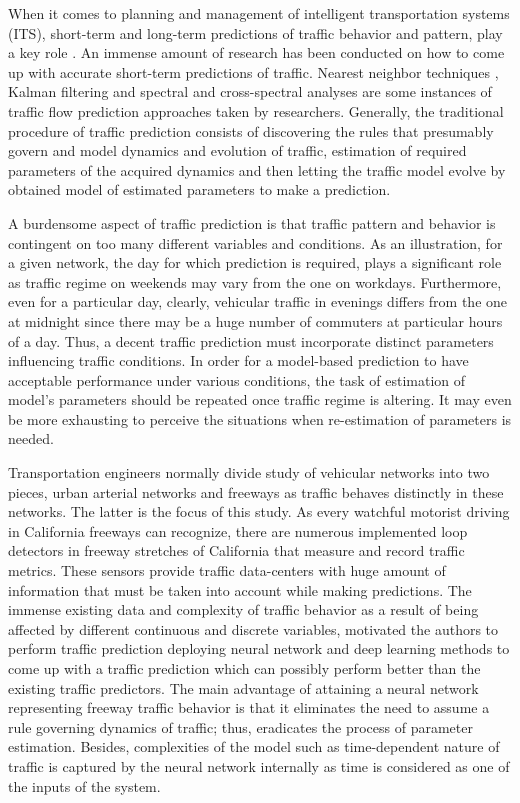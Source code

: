 \documentclass[twocolumn,10pt]{asme2e}
\begin{document}
When it comes to planning and management of intelligent transportation systems (ITS), short-term and long-term predictions of traffic behavior and pattern, play a key role \cite{TrafficPrediction}. An immense amount of research has been conducted on how to come up with accurate short-term predictions of traffic. Nearest neighbor techniques \cite{nearestNeighbor}, Kalman filtering \cite{Kalman} and spectral and cross-spectral analyses \cite{spectral} are some instances of traffic flow prediction approaches taken by researchers. Generally, the traditional procedure of traffic prediction consists of discovering the rules that presumably govern and model dynamics and evolution of traffic, estimation of required parameters of the acquired dynamics and then letting the traffic model evolve by obtained model of estimated parameters to make a prediction.   

A burdensome aspect of traffic prediction is that traffic pattern and behavior is contingent on too many different variables and conditions. As an illustration, for a given network, the day for which prediction is required, plays a significant role as traffic regime on weekends may vary from the one on workdays. Furthermore, even for a particular day, clearly, vehicular traffic in evenings differs from the one at midnight since there may be a huge number of commuters at particular hours of a day. Thus, a decent traffic prediction must incorporate distinct parameters influencing traffic conditions. In order for a model-based prediction to have acceptable performance under various conditions, the task of estimation of model's parameters should be repeated once traffic regime is altering. It may even be more exhausting to perceive the situations when re-estimation of parameters is needed. 

Transportation engineers normally divide study of vehicular networks into two pieces, urban arterial networks and freeways as traffic behaves distinctly in these networks. The latter is the focus of this study. 
As every watchful motorist driving in California freeways can recognize, there are numerous implemented loop detectors in freeway stretches of California that measure and record traffic metrics. These sensors provide traffic data-centers with huge amount of information that must be taken into account while making predictions. The immense existing data and complexity of traffic behavior as a result of being affected by different continuous and discrete variables, motivated the authors to perform traffic prediction deploying neural network and deep learning methods to come up with a traffic prediction which can possibly perform better than the existing traffic predictors\cite{NNreview}. The main advantage of attaining a neural network representing freeway traffic behavior is that it eliminates the need to assume a rule governing dynamics of traffic; thus, eradicates the process of parameter estimation. Besides, complexities of the model such as time-dependent nature of traffic is captured by the neural network internally as time is considered as one of the inputs of the system. 
\end{document}
